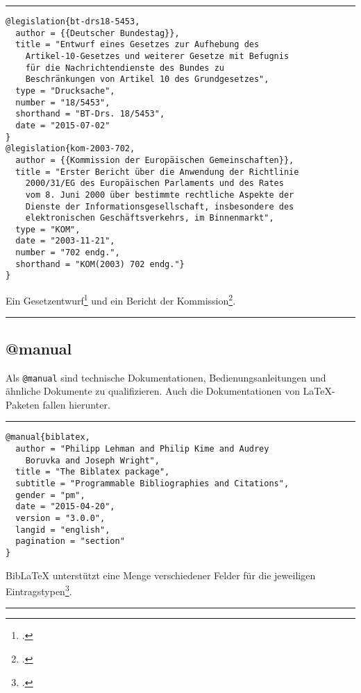 \documentclass[11pt,a4paper,DIV=calc]{scrartcl}
\newcommand\software[1]{\textsf{#1}}
\newcommand\Biblatex{\software{Bib\LaTeX{}}\xspace}
\newenvironment{rubexample}{\par\vspace{\baselineskip}\hrule\par\begin{refsection}}{\end{refsection}\par\hrule\par\vspace{\baselineskip}}
\begin{document}
\begin{rubexample}
\begin{verbatim}
@legislation{bt-drs18-5453,
  author = {{Deutscher Bundestag}},
  title = "Entwurf eines Gesetzes zur Aufhebung des
    Artikel-10-Gesetzes und weiterer Gesetze mit Befugnis
    für die Nachrichtendienste des Bundes zu
    Beschränkungen von Artikel 10 des Grundgesetzes",
  type = "Drucksache",
  number = "18/5453",
  shorthand = "BT-Drs. 18/5453",
  date = "2015-07-02"
}
@legislation{kom-2003-702,
  author = {{Kommission der Europäischen Gemeinschaften}},
  title = "Erster Bericht über die Anwendung der Richtlinie
    2000/31/EG des Europäischen Parlaments und des Rates
    vom 8. Juni 2000 über bestimmte rechtliche Aspekte der
    Dienste der Informationsgesellschaft, insbesondere des
    elektronischen Geschäftsverkehrs, im Binnenmarkt",
  type = "KOM",
  date = "2003-11-21",
  number = "702 endg.",
  shorthand = "KOM(2003) 702 endg."}
}
\end{verbatim}

Ein Gesetzentwurf\footcite{bt-drs18-5453} und ein
Bericht der Kommission\footcite[15]{kom-2003-702}.

\printbibliography
\end{rubexample}

\subsection{@manual}

Als \verb+@manual+ sind technische Dokumentationen,
Bedienungsanleitungen und ähnliche Dokumente zu qualifizieren. Auch
die Dokumentationen von \LaTeX{}-\\Pa\-ke\-ten fallen hierunter.

\begin{rubexample}
\begin{verbatim}
@manual{biblatex,
  author = "Philipp Lehman and Philip Kime and Audrey
    Boruvka and Joseph Wright",
  title = "The Biblatex package",
  subtitle = "Programmable Bibliographies and Citations",
  gender = "pm",
  date = "2015-04-20",
  version = "3.0.0",
  langid = "english",
  pagination = "section"
}
\end{verbatim}

\Biblatex unterstützt eine Menge verschiedener Felder für die
jeweiligen Eintragstypen\footcite[2.2.2]{biblatex}.

\printbibliography
\end{rubexample}
\end{document}
